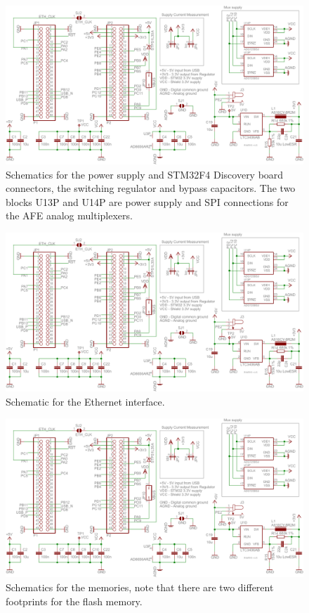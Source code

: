 \begin{figure}[htpb]
  \centering
    \includegraphics[angle=90,page=1]{bilder/schem.pdf}
  \caption{Schematics for the power supply and STM32F4 Discovery board connectors, the switching regulator and bypass
    capacitors. The two blocks U13P and U14P are power supply and SPI connections for the AFE analog multiplexers.}
  \label{fig:schem_power}
\end{figure}

\begin{figure}[htpb]
  \centering
    \includegraphics[angle=90,page=4]{bilder/schem.pdf}
  \caption{Schematic for the Ethernet interface.}
  \label{fig:schem_ethernet}
\end{figure}

\begin{figure}[htpb]
  \centering
    \includegraphics[page=3]{bilder/schem.pdf}
  \caption{Schematics for the memories, note that there are two different footprints for the flash memory.}
  \label{fig:schem_memory}
\end{figure}

